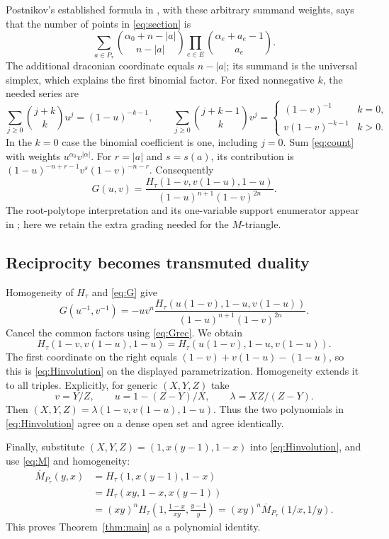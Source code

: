 \documentclass[11pt]{article}
\newcommand{\M}{\overline M}
\begin{document}
Postnikov's established formula in
\cite[Theorem 2.1 and Lemma 4.1]{AC}, with these arbitrary summand
weights, says that the number of points in \eqref{eq:section} is
\begin{equation}\label{eq:count}
 \sum_{a\in P_\tau}
       \binom{\alpha_0+n-|a|}{n-|a|}
       \prod_{e\in E}\binom{\alpha_e+a_e-1}{a_e}.
\end{equation}
The additional draconian coordinate equals $n-|a|$; its summand
is the universal simplex, which explains the first binomial factor.
For fixed nonnegative $k$, the needed series are
\[
 \sum_{j\ge0}\binom{j+k}{k}u^j=(1-u)^{-k-1},\qquad
 \sum_{j\ge0}\binom{j+k-1}{k}v^j=
 \begin{cases}(1-v)^{-1}&k=0,\\v(1-v)^{-k-1}&k>0.\end{cases}
\]
In the $k=0$ case the binomial coefficient is one, including $j=0$.
Sum \eqref{eq:count} with weights $u^{\alpha_0}v^{|\alpha|}$.
For $r=|a|$ and $s=s(a)$, its contribution is
$(1-u)^{-n+r-1}v^s(1-v)^{-n-r}$. Consequently
\begin{equation}\label{eq:G}
 G(u,v)=\frac{H_\tau(1-v,v(1-u),1-u)}
                    {(1-u)^{n+1}(1-v)^{2n}}.
\end{equation}
The root-polytope interpretation and its one-variable support
enumerator appear in \cite[Section 4.2]{D}; here we retain the
extra grading needed for the $M$-triangle.

\subsection*{Reciprocity becomes transmuted duality}
Homogeneity of $H_\tau$ and \eqref{eq:G} give
\[
 G(u^{-1},v^{-1})=
 -u v^n\frac{H_\tau(u(1-v),1-u,v(1-u))}
                    {(1-u)^{n+1}(1-v)^{2n}}.
\]
Cancel the common factors using \eqref{eq:Grec}. We obtain
\begin{equation}\label{eq:param}
 H_\tau(1-v,v(1-u),1-u)
       =H_\tau(u(1-v),1-u,v(1-u)).
\end{equation}
The first coordinate on the right equals
$(1-v)+v(1-u)-(1-u)$, so this is \eqref{eq:Hinvolution}
on the displayed parametrization. Homogeneity extends it to all
triples. Explicitly, for generic $(X,Y,Z)$ take
\[
 v=Y/Z,\qquad u=1-(Z-Y)/X,\qquad \lambda=XZ/(Z-Y).
\]
Then $(X,Y,Z)=\lambda(1-v,v(1-u),1-u)$. Thus the two polynomials
in \eqref{eq:Hinvolution} agree on a dense open set and agree identically.

Finally, substitute $(X,Y,Z)=(1,x(y-1),1-x)$ into
\eqref{eq:Hinvolution}, and use \eqref{eq:M} and homogeneity:
\begin{align*}
 \M_{P_\tau}(y,x)
 &=H_\tau(1,x(y-1),1-x)\\
 &=H_\tau(xy,1-x,x(y-1))\\
 &=(xy)^n H_\tau\left(1,\frac{1-x}{xy},\frac{y-1}{y}\right)
  =(xy)^n\M_{P_\tau}(1/x,1/y).
\end{align*}
This proves Theorem~\ref{thm:main} as a polynomial identity.
\end{document}
